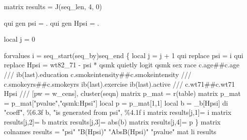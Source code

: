 \documentclass[
  10pt,
  a4paper,
]{book}
\newenvironment{Shaded}{\begin{snugshade}}{\end{snugshade}}
\newcommand{\CommentTok}[1]{\textcolor[rgb]{0.37,0.37,0.37}{#1}}
\newcommand{\FunctionTok}[1]{\textcolor[rgb]{0.28,0.35,0.67}{#1}}
\newcommand{\KeywordTok}[1]{\textcolor[rgb]{0.00,0.46,0.62}{#1}}
\newcommand{\NormalTok}[1]{\textcolor[rgb]{0.00,0.46,0.62}{#1}}
\newcommand{\OtherTok}[1]{\textcolor[rgb]{0.00,0.46,0.62}{#1}}
\newcommand{\StringTok}[1]{\textcolor[rgb]{0.13,0.47,0.30}{#1}}
\begin{document}
\begin{Shaded}
\begin{Highlighting}[]
\FunctionTok{matrix}\NormalTok{ results = }\FunctionTok{J}\NormalTok{(}\OtherTok{\textasciigrave{}seq\_len\textquotesingle{}}\NormalTok{, 4, 0)}

\KeywordTok{qui} \KeywordTok{gen}\NormalTok{ psi = .}
\KeywordTok{qui} \KeywordTok{gen}\NormalTok{ Hpsi = .}

\KeywordTok{local}\NormalTok{ j = 0}

\KeywordTok{forvalues}\NormalTok{ i =  }\OtherTok{\textasciigrave{}seq\_start\textquotesingle{}}\NormalTok{(}\OtherTok{\textasciigrave{}seq\_by\textquotesingle{}}\NormalTok{)}\OtherTok{\textasciigrave{}seq\_end\textquotesingle{}}\NormalTok{ \{}
    \KeywordTok{local}\NormalTok{ j = }\OtherTok{\textasciigrave{}j\textquotesingle{}}\NormalTok{ + 1}
    \KeywordTok{qui} \KeywordTok{replace}\NormalTok{ psi = }\OtherTok{\textasciigrave{}i\textquotesingle{}}
    \KeywordTok{qui} \KeywordTok{replace}\NormalTok{ Hpsi = wt82\_71 {-} psi * qsmk }
    \KeywordTok{quietly} \KeywordTok{logit}\NormalTok{ qsmk sex race c.age\#\#c.age }\CommentTok{///}
\NormalTok{      ib(}\FunctionTok{last}\NormalTok{).education c.smokeintensity\#\#c.smokeintensity }\CommentTok{///}
\NormalTok{      c.smokeyrs\#\#c.smokeyrs ib(}\FunctionTok{last}\NormalTok{).exercise ib(}\FunctionTok{last}\NormalTok{).active }\CommentTok{///}
\NormalTok{      c.wt71\#\#c.wt71 Hpsi }\CommentTok{///}
\NormalTok{      [pw = w\_cens], }\KeywordTok{cluster}\NormalTok{(seqn)}
    \FunctionTok{matrix}\NormalTok{ p\_mat = }\FunctionTok{r}\NormalTok{(}\KeywordTok{table}\NormalTok{)}
    \FunctionTok{matrix}\NormalTok{ p\_mat = p\_mat[}\StringTok{"pvalue"}\NormalTok{,}\StringTok{"qsmk:Hpsi"}\NormalTok{]}
    \KeywordTok{local} \KeywordTok{p}\NormalTok{ = p\_mat[1,1]}
    \KeywordTok{local}\NormalTok{ b = \_b[Hpsi]}
    \KeywordTok{di} \StringTok{"coeff"}\NormalTok{, \%6.3f }\OtherTok{\textasciigrave{}b\textquotesingle{}}\NormalTok{, }\StringTok{"is generated from psi"}\NormalTok{, \%4.1f }\OtherTok{\textasciigrave{}i\textquotesingle{}}
    \FunctionTok{matrix}\NormalTok{ results[}\OtherTok{\textasciigrave{}j\textquotesingle{}}\NormalTok{,1]= }\OtherTok{\textasciigrave{}i\textquotesingle{}}
    \FunctionTok{matrix}\NormalTok{ results[}\OtherTok{\textasciigrave{}j\textquotesingle{}}\NormalTok{,2]= }\OtherTok{\textasciigrave{}b\textquotesingle{}}
    \FunctionTok{matrix}\NormalTok{ results[}\OtherTok{\textasciigrave{}j\textquotesingle{}}\NormalTok{,3]= }\FunctionTok{abs}\NormalTok{(}\OtherTok{\textasciigrave{}b\textquotesingle{}}\NormalTok{)}
    \FunctionTok{matrix}\NormalTok{ results[}\OtherTok{\textasciigrave{}j\textquotesingle{}}\NormalTok{,4]= }\OtherTok{\textasciigrave{}p\textquotesingle{}}
\NormalTok{\}}
\FunctionTok{matrix} \OtherTok{colnames}\NormalTok{ results = }\StringTok{"psi"} \StringTok{"B(Hpsi)"} \StringTok{"AbsB(Hpsi)"} \StringTok{"pvalue"}
\NormalTok{mat li results }


\end{Highlighting}
\end{Shaded}
\end{document}
